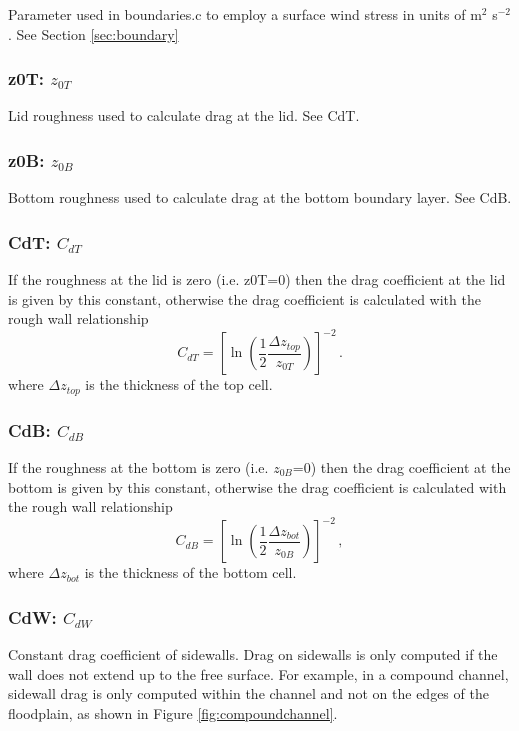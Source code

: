 \documentclass[12pt,oneside]{article}
\begin{document}
Parameter used in boundaries.c to employ a surface wind stress in units of m$^2$ s$^{-2}$.
See Section \ref{sec:boundary}

\subsubsection{z0T: $z_{0T}$}

Lid roughness used to calculate drag at the lid.  See CdT.

\subsubsection{z0B: $z_{0B}$}

Bottom roughness used to calculate drag at the bottom boundary layer.  See CdB.

\subsubsection{CdT: $C_{dT}$}

If the roughness at the lid is zero (i.e. z0T=0) then the drag coefficient at the lid is given by
this constant, otherwise the drag coefficient is calculated with the rough wall 
relationship
\[
C_{dT} = \left[\ln\left(\frac{1}{2}\frac{\Delta z_{top}}{z_{0T}}\right)\right]^{-2}\,.
\]
where $\Delta z_{top}$ is the thickness of the top cell.

\subsubsection{CdB: $C_{dB}$}

If the roughness at the bottom is zero (i.e. $z_{0B}$=0) then the drag coefficient at the bottom is given by
this constant, otherwise the drag coefficient is calculated with the rough wall
relationship
\[
C_{dB} = \left[\ln\left(\frac{1}{2}\frac{\Delta z_{bot}}{z_{0B}}\right)\right]^{-2}\,,
\]
where $\Delta z_{bot}$ is the thickness of the bottom cell.

\subsubsection{CdW: $C_{dW}$}

Constant drag coefficient of sidewalls.  Drag on sidewalls is only computed if the wall
does not extend up to the free surface.  For example, in a compound channel, sidewall
drag is only computed within the channel and not on the edges of the floodplain, as shown
in Figure \ref{fig:compoundchannel}.
\end{document}
